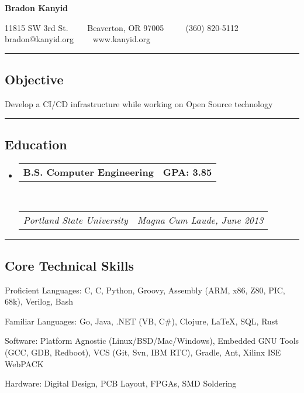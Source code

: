 \documentclass[10pt,letterpaper]{article}
\makeatletter
\newenvironment{indentsection}[1]%
{\begin{list}{}%
	{\setlength{\leftmargin}{#1}}%
	\item[]%
}
{\end{list}}
\newcommand{\headerrow}[2]
{\begin{tabular*}{\linewidth}{l@{\extracolsep{\fill}}r}
	#1 &
	#2 \\
\end{tabular*}}
\newcommand{\CPP}
{C\nolinebreak[4]\hspace{-.05em}\raisebox{.22ex}{\footnotesize\bf ++}}
\makeatother
\begin{document}
\begin{center}
{\LARGE \textbf{Bradon Kanyid}}

11815 SW 3rd St.\ \ \textbullet
\ \ Beaverton, OR 97005 \ \ \textbullet
\ \ (360) 820-5112\\
bradon@kanyid.org\ \ \textbullet
\ \ www.kanyid.org
\end{center}

\hrule
\vspace{-0.4em}
\subsection*{Objective}
\begin{indentsection}{\parindent}
\begin{description*}
	\item Develop a CI/CD infrastructure while working on Open Source technology
\end{description*}
\end{indentsection}
\vspace{1em}

\hrule
\vspace{-0.4em}
\subsection*{Education}

\begin{itemize}
	\parskip=0.1em

	\item 
	\headerrow
        {\textbf{B.S. Computer Engineering}}
		{\textbf{GPA: 3.85}}
	\\
	\headerrow
		{\emph{Portland State University}}
		{\emph{Magna Cum Laude, June 2013}}
\end{itemize}
\vspace{1em}

\hrule
\vspace{-0.4em}
\subsection*{Core Technical Skills}

\begin{indentsection}{\parindent}
\begin{description*}
	\item[Proficient Languages:]
    C, \CPP, Python, Groovy, Assembly (ARM, x86, Z80, PIC, 68k), Verilog, Bash
	\item[Familiar Languages:]
    Go, Java, .NET (VB, C\#), Clojure, \LaTeX, SQL, Rust
	\item[Software:]
    Platform Agnostic (Linux/BSD/Mac/Windows), Embedded GNU Tools (GCC, GDB, Redboot), VCS (Git, Svn, IBM RTC), Gradle, Ant, Xilinx ISE WebPACK
	\item[Hardware:]
    Digital Design, PCB Layout, FPGAs, SMD Soldering 
\end{description*}
\end{indentsection}
\vspace{1em}
\end{document}

